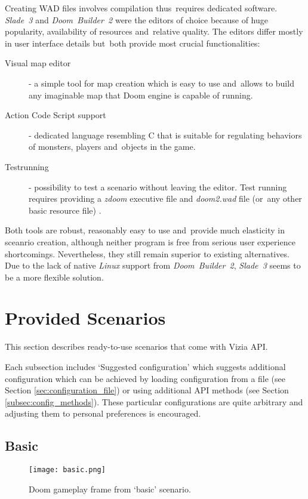 	Creating WAD files involves compilation thus~requires dedicated software. \emph{Slade~3} and \emph{Doom~Builder~2} were the editors of choice because of huge popularity, availability of resources and~relative quality. The editors differ mostly in user interface details but~both provide most crucial functionalities:

	\begin{description}
		\item [Visual map editor] - a simple tool for map creation which is easy to use and~allows to build any imaginable map that Doom engine is capable of running.
		\item [Action Code Script support] - dedicated language resembling C that is suitable for regulating behaviors of monsters, players and~objects in the game.
		\item [Testrunning] - possibility to test a scenario without leaving the editor. Test running requires providing a \emph{zdoom} executive file and \emph{doom2.wad} file (or~any other basic resource file) . 
	\end{description}

	Both tools are robust, reasonably easy to use and~provide much elasticity in sceanrio creation, although neither program is free from serious user experience shortcomings. Nevertheless, they still remain superior to existing alternatives. Due to the lack of native \emph{Linux} support from \emph{Doom~Builder~2}, \emph{Slade~3} seems to be a more flexible solution. 

	\newpage
\section{Provided Scenarios}\label{sec:scenarios}
	This section describes ready-to-use scenarios that come with Vizia API.

	Each subsection includes `Suggested configuration' which suggests additional configuration which can be achieved by loading	configuration from a file (see Section \ref{sec:configuration_file}) or using additional API methods (see Section \ref{subsec:config_methods}). These particular configurations are quite arbitrary and adjusting them to personal preferences is encouraged.

	\subsection{Basic}\label{subsec:basic}
		
		\begin{figure}
			\centering
			\texttt{[image: basic.png]}
			\caption{Doom gameplay frame from `basic' scenario.}\label{fig:basic}
		\end{figure}

